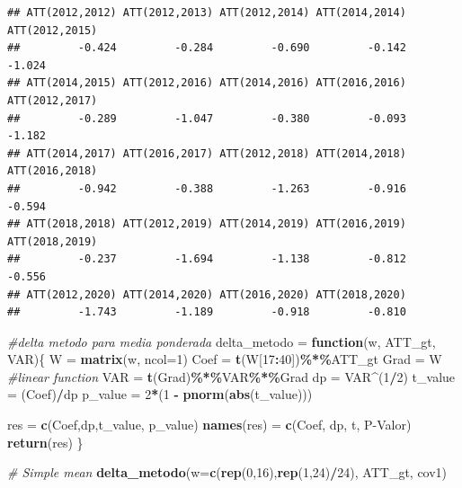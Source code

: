 \documentclass[
]{article}
\newenvironment{Shaded}{\begin{snugshade}}{\end{snugshade}}
\newcommand{\AttributeTok}[1]{\textcolor[rgb]{0.13,0.29,0.53}{#1}}
\newcommand{\CommentTok}[1]{\textcolor[rgb]{0.56,0.35,0.01}{\textit{#1}}}
\newcommand{\ControlFlowTok}[1]{\textcolor[rgb]{0.13,0.29,0.53}{\textbf{#1}}}
\newcommand{\DecValTok}[1]{\textcolor[rgb]{0.00,0.00,0.81}{#1}}
\newcommand{\FunctionTok}[1]{\textcolor[rgb]{0.13,0.29,0.53}{\textbf{#1}}}
\newcommand{\NormalTok}[1]{#1}
\newcommand{\OtherTok}[1]{\textcolor[rgb]{0.56,0.35,0.01}{#1}}
\newcommand{\SpecialCharTok}[1]{\textcolor[rgb]{0.81,0.36,0.00}{\textbf{#1}}}
\newcommand{\StringTok}[1]{\textcolor[rgb]{0.31,0.60,0.02}{#1}}
\begin{document}
\begin{verbatim}
## ATT(2012,2012) ATT(2012,2013) ATT(2012,2014) ATT(2014,2014) ATT(2012,2015) 
##         -0.424         -0.284         -0.690         -0.142         -1.024 
## ATT(2014,2015) ATT(2012,2016) ATT(2014,2016) ATT(2016,2016) ATT(2012,2017) 
##         -0.289         -1.047         -0.380         -0.093         -1.182 
## ATT(2014,2017) ATT(2016,2017) ATT(2012,2018) ATT(2014,2018) ATT(2016,2018) 
##         -0.942         -0.388         -1.263         -0.916         -0.594 
## ATT(2018,2018) ATT(2012,2019) ATT(2014,2019) ATT(2016,2019) ATT(2018,2019) 
##         -0.237         -1.694         -1.138         -0.812         -0.556 
## ATT(2012,2020) ATT(2014,2020) ATT(2016,2020) ATT(2018,2020) 
##         -1.743         -1.189         -0.918         -0.810
\end{verbatim}

\begin{Shaded}
\begin{Highlighting}[]
\CommentTok{\#delta metodo para media ponderada}
\NormalTok{delta\_metodo }\OtherTok{=} \ControlFlowTok{function}\NormalTok{(w, ATT\_gt, VAR)\{}
\NormalTok{  W }\OtherTok{=} \FunctionTok{matrix}\NormalTok{(w, }\AttributeTok{ncol=}\DecValTok{1}\NormalTok{)}
\NormalTok{  Coef }\OtherTok{=} \FunctionTok{t}\NormalTok{(W[}\DecValTok{17}\SpecialCharTok{:}\DecValTok{40}\NormalTok{])}\SpecialCharTok{\%*\%}\NormalTok{ATT\_gt}
\NormalTok{  Grad }\OtherTok{=}\NormalTok{ W }\CommentTok{\#linear function}
\NormalTok{  VAR }\OtherTok{=} \FunctionTok{t}\NormalTok{(Grad)}\SpecialCharTok{\%*\%}\NormalTok{VAR}\SpecialCharTok{\%*\%}\NormalTok{Grad}
\NormalTok{  dp }\OtherTok{=}\NormalTok{ VAR}\SpecialCharTok{\^{}}\NormalTok{(}\DecValTok{1}\SpecialCharTok{/}\DecValTok{2}\NormalTok{)}
\NormalTok{  t\_value }\OtherTok{=}\NormalTok{ (Coef)}\SpecialCharTok{/}\NormalTok{dp}
\NormalTok{  p\_value }\OtherTok{=} \DecValTok{2}\SpecialCharTok{*}\NormalTok{(}\DecValTok{1} \SpecialCharTok{{-}} \FunctionTok{pnorm}\NormalTok{(}\FunctionTok{abs}\NormalTok{(t\_value)))}
  
\NormalTok{  res }\OtherTok{=} \FunctionTok{c}\NormalTok{(Coef,dp,t\_value, p\_value)}
  \FunctionTok{names}\NormalTok{(res) }\OtherTok{=} \FunctionTok{c}\NormalTok{(}\StringTok{\textquotesingle{}Coef\textquotesingle{}}\NormalTok{, }\StringTok{\textquotesingle{}dp\textquotesingle{}}\NormalTok{, }\StringTok{\textquotesingle{}t\textquotesingle{}}\NormalTok{, }\StringTok{\textquotesingle{}P{-}Valor\textquotesingle{}}\NormalTok{)}
  \FunctionTok{return}\NormalTok{(res)}
\NormalTok{\}}

\CommentTok{\# Simple mean}
\FunctionTok{delta\_metodo}\NormalTok{(}\AttributeTok{w=}\FunctionTok{c}\NormalTok{(}\FunctionTok{rep}\NormalTok{(}\DecValTok{0}\NormalTok{,}\DecValTok{16}\NormalTok{),}\FunctionTok{rep}\NormalTok{(}\DecValTok{1}\NormalTok{,}\DecValTok{24}\NormalTok{)}\SpecialCharTok{/}\DecValTok{24}\NormalTok{), ATT\_gt, cov1)}
\end{Highlighting}
\end{Shaded}
\end{document}
